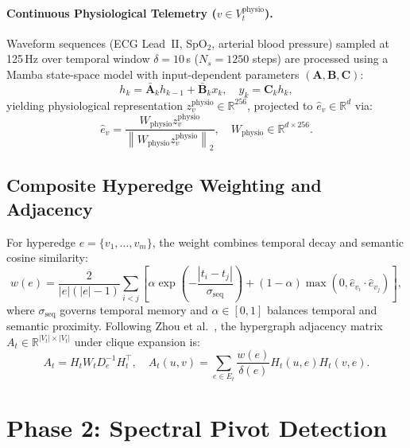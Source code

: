 \documentclass[10pt, onecolumn]{article}
\newcommand{\R}{\mathbb{R}}
\newcommand{\norm}[1]{\left\lVert#1\right\rVert}
\begin{document}
\paragraph{Continuous Physiological Telemetry ($v \in V_t^{\text{physio}}$).}
Waveform sequences (ECG Lead~II, SpO$_2$, arterial blood pressure) sampled at 125\,Hz over temporal window $\delta = 10$\,s ($N_s = 1250$ steps) are processed using a Mamba state-space model \cite{gu2023mamba} with input-dependent parameters $(\bm{A}, \bm{B}, \bm{C})$:
\begin{equation}
  h_k = \bar{\bm{A}}_k h_{k-1} + \bar{\bm{B}}_k x_k, \quad y_k = \bm{C}_k h_k,
  \label{eq:mamba_ssm}
\end{equation}
yielding physiological representation $z_v^{\text{physio}} \in \R^{256}$, projected to $\hat{e}_v \in \R^d$ via:
\begin{equation}
  \hat{e}_v = \frac{W_{\text{physio}} z_v^{\text{physio}}}{\norm{W_{\text{physio}} z_v^{\text{physio}}}_2}, \quad W_{\text{physio}} \in \R^{d \times 256}.
  \label{eq:physio_proj}
\end{equation}

\subsection{Composite Hyperedge Weighting and Adjacency}
For hyperedge $e = \{v_1, \dots, v_m\}$, the weight combines temporal decay and semantic cosine similarity:
\begin{equation}
  w(e) = \frac{2}{|e|(|e|-1)} \sum_{i < j} \left[ \alpha \exp\!\left(-\frac{|t_i - t_j|}{\sigma_{\text{seq}}}\right) + (1-\alpha) \max(0, \hat{e}_{v_i} \cdot \hat{e}_{v_j}) \right],
  \label{eq:comp_weight}
\end{equation}
where $\sigma_{\text{seq}}$ governs temporal memory and $\alpha \in [0, 1]$ balances temporal and semantic proximity. Following Zhou et al.\ \cite{zhou2006learning}, the hypergraph adjacency matrix $A_t \in \R^{|V_t| \times |V_t|}$ under clique expansion is:
\begin{equation}
  A_t = H_t W_t D_e^{-1} H_t^\top, \quad A_t(u, v) = \sum_{e \in E_t} \frac{w(e)}{\delta(e)} H_t(u, e) H_t(v, e).
  \label{eq:adj_zhou}
\end{equation}

\section{Phase 2: Spectral Pivot Detection}
\label{sec:phase2}
\end{document}
